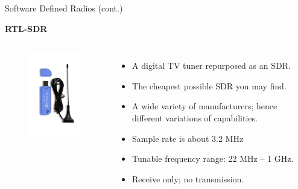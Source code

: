 \documentclass[handout]{beamer}
\begin{document}
\begin{frame}{Software Defined Radios (cont.)}  

\footnotesize
\textbf{RTL-SDR}

\begin{columns}


	\begin{figure}
		\includegraphics[width=100pt]{figures/rtl-sdr.jpg}
	\end{figure}


	\begin{itemize}
	\footnotesize
	\item A digital TV tuner repurposed as an SDR.
		\vspace{5pt}
	\item The cheapest possible SDR you may find.
		\vspace{5pt}
	\item A wide variety of manufacturers; hence different variations of capabilities.
		\vspace{5pt}
	\item Sample rate is about 3.2 MHz
		\vspace{5pt}
	\item Tunable frequency range: 22 MHz -- 1 GHz.
		\vspace{5pt}
	\item Receive only; no transmission.
	\end{itemize}


\end{columns}

\end{frame}
\end{document}
